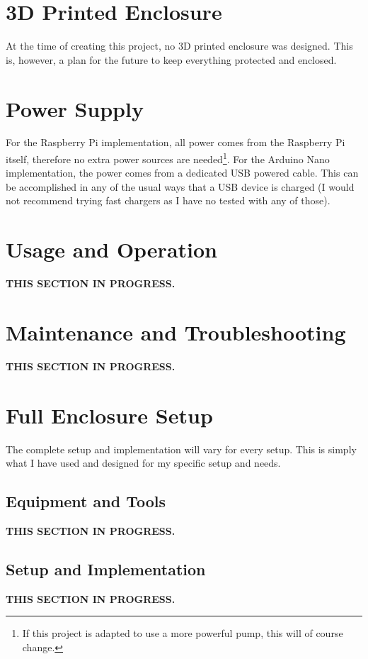 \documentclass{article}
\begin{document}
\begin{multicols}{2}
		\section{3D Printed Enclosure}
		At the time of creating this project, no 3D printed enclosure was designed. This is, however, a plan for the future to keep everything protected and enclosed.
		
		\section{Power Supply}
		For the Raspberry Pi implementation, all power comes from the Raspberry Pi itself, therefore no extra power sources are needed\footnote{If this project is adapted to use a more powerful pump, this will of course change.}. For the Arduino Nano implementation, the power comes from a dedicated USB powered cable. This can be accomplished in any of the usual ways that a USB device is charged (I would not recommend trying fast chargers as I have no tested with any of those).
		
		\section{Usage and Operation}
		\textbf{THIS SECTION IN PROGRESS.}
		
		\section{Maintenance and Troubleshooting}
		\textbf{THIS SECTION IN PROGRESS.}
		
		\section{Full Enclosure Setup}		
		The complete setup and implementation will vary for every setup. This is simply what I have used and designed for my specific setup and needs.
		
			\subsection{Equipment and Tools}
			\textbf{THIS SECTION IN PROGRESS.}
			
			\subsection{Setup and Implementation}
			\textbf{THIS SECTION IN PROGRESS.}
		

\end{multicols}
\end{document}
